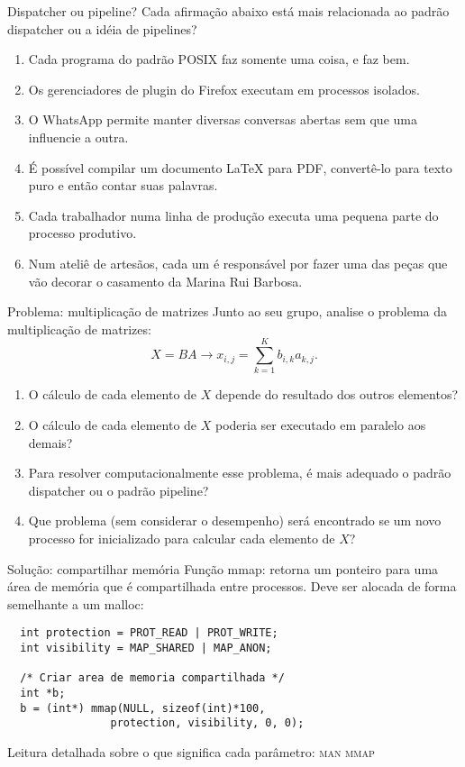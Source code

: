 \documentclass{beamer}
\begin{document}
\begin{frame}[fragile]{Dispatcher ou pipeline?}
  \centering
  \large
  Cada afirmação abaixo está mais relacionada ao padrão dispatcher ou a idéia de
  pipelines?
  \begin{enumerate}
  \item Cada programa do padrão POSIX faz somente uma coisa, e faz bem.
  \item Os gerenciadores de plugin do Firefox executam em processos isolados.
  \item O WhatsApp permite manter diversas conversas abertas sem que uma
    influencie a outra.
  \item É possível compilar um documento LaTeX para PDF, convertê-lo para
    texto puro e então contar suas palavras.
  \item Cada trabalhador numa linha de produção executa uma pequena parte do
    processo produtivo.
  \item Num ateliê de artesãos, cada um é responsável por fazer uma das peças
    que vão decorar o casamento da Marina Rui Barbosa.
  \end{enumerate}
\end{frame}

\begin{frame}[fragile]{Problema: multiplicação de matrizes}
  \centering
  \large
  Junto ao seu grupo, analise o problema da multiplicação de matrizes:
  \begin{equation}
  X = BA \rightarrow x_{i,j} = \sum_{k=1}^K b_{i, k} a_{k, j}.
  \end{equation}
  \begin{enumerate}
    \item O cálculo de cada elemento de $X$ depende do resultado dos outros
      elementos?
    \item O cálculo de cada elemento de $X$ poderia ser executado em paralelo
      aos demais?
    \item Para resolver computacionalmente esse problema, é mais adequado o
      padrão dispatcher ou o padrão pipeline?
    \item Que problema (sem considerar o desempenho) será encontrado se um novo
      processo for inicializado para calcular cada elemento de $X$?
  \end{enumerate}
\end{frame}

\begin{frame}[fragile]{Solução: compartilhar memória}
  \large
  Função mmap: retorna um ponteiro para uma área de memória que é compartilhada
  entre processos. Deve ser alocada de forma semelhante a um malloc:
  \begin{verbatim}
  int protection = PROT_READ | PROT_WRITE;
  int visibility = MAP_SHARED | MAP_ANON;

  /* Criar area de memoria compartilhada */
  int *b;
  b = (int*) mmap(NULL, sizeof(int)*100,
                protection, visibility, 0, 0);
  \end{verbatim}

  Leitura detalhada sobre o que significa cada parâmetro: \textsc{man mmap}
\end{frame}
\end{document}
